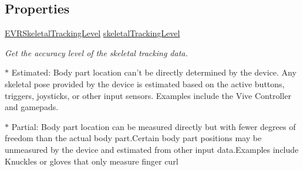 \subsection*{Properties}
\begin{DoxyCompactItemize}
\item 
\mbox{\hyperlink{namespace_valve_1_1_v_r_a6f46bd50fb65255d6537ab32a6bddc30}{E\+V\+R\+Skeletal\+Tracking\+Level}} \mbox{\hyperlink{interface_valve_1_1_v_r_1_1_i_steam_v_r___action___skeleton___source_ab32334c7fddee9e954e1a23ffae8a171}{skeletal\+Tracking\+Level}}
\begin{DoxyCompactList}\small\item\em Get the accuracy level of the skeletal tracking data. 

$\ast$ Estimated\+: Body part location can’t be directly determined by the device. Any skeletal pose provided by the device is estimated based on the active buttons, triggers, joysticks, or other input sensors. Examples include the Vive Controller and gamepads. 

$\ast$ Partial\+: Body part location can be measured directly but with fewer degrees of freedom than the actual body part.\+Certain body part positions may be unmeasured by the device and estimated from other input data.\+Examples include Knuckles or gloves that only measure finger curl 


\end{DoxyCompactList}
\end{DoxyCompactItemize}
